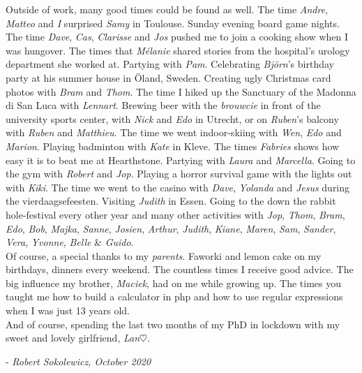 Outside of work, many good times could be found as well. The time \emph{Andre}, \emph{Matteo} and \emph{I} surprised \emph{Samy} in Toulouse. Sunday evening board game nights. The time \emph{Dave}, \emph{Cas}, \emph{Clarisse} and \emph{Jos} pushed me to join a cooking show when I was hungover. The times that \emph{M\'elanie} shared stories from the hospital's urology department she worked at. Partying with \emph{Pam}. Celebrating \emph{Bj\"orn}'s birthday party at his summer house in \"Oland, Sweden. 
Creating ugly Christmas card photos with \emph{Bram} and \emph{Thom}. The time I hiked up the Sanctuary of the Madonna di San Luca with \emph{Lennart}. 
Brewing beer with the \emph{brouwcie} in front of the university sports center, with \emph{Nick} and \emph{Edo} in Utrecht, or on \emph{Ruben}'s balcony with \emph{Ruben} and \emph{Matthieu}. The time we went indoor-skiing with \emph{Wen}, \emph{Edo} and \emph{Marion}. Playing badminton with \emph{Kate} in Kleve. The times \emph{Fabries} shows how easy it is to beat me at Hearthstone. Partying with \emph{Laura} and \emph{Marcella}. Going to the gym with \emph{Robert} and \emph{Jop}. Playing a horror survival game with the lights out with \emph{Kiki}. The time we went to the casino with \emph{Dave}, \emph{Yolanda} and \emph{Jesus} during the vierdaagsefeesten.  Visiting \emph{Judith} in Essen. Going to the down the rabbit hole-festival every other year and many other activities with \emph{Jop}, \emph{Thom}, \emph{Bram}, \emph{Edo}, \emph{Bob}, \emph{Majka}, \emph{Sanne}, \emph{Josien}, \emph{Arthur}, \emph{Judith}, \emph{Kiane}, \emph{Maren}, \emph{Sam}, \emph{Sander}, \emph{Vera}, \emph{Yvonne}, \emph{Belle} \& \emph{Guido}. \\[0.5em]

Of course, a special thanks to my \emph{parents}. Faworki and lemon cake on my birthdays, dinners every weekend. The countless times I receive good advice. The big influence my brother, \emph{Maciek}, had on me while growing up. The times you taught me how to build a calculator in php and how to use regular expressions when I was just 13 years old.  \\[0.5em]

And of course, spending the last two months of my PhD in lockdown with my sweet and lovely girlfriend, \emph{Lan}$\heartsuit$.

\begin{flushright} - \emph{Robert Sokolewicz, October 2020}\end{flushright}
